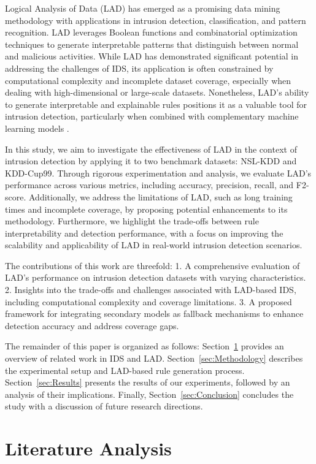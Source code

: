 \documentclass[pdflatex,sn-mathphys-num]{sn-jnl}%
\theoremstyle{thmstyleone}%
\theoremstyle{thmstyletwo}%
\theoremstyle{thmstylethree}%
\begin{document}
Logical Analysis of Data (LAD) has emerged as a promising data mining methodology with applications in intrusion detection, classification, and pattern recognition. LAD leverages Boolean functions and combinatorial optimization techniques to generate interpretable patterns that distinguish between normal and malicious activities. While LAD has demonstrated significant potential in addressing the challenges of IDS, its application is often constrained by computational complexity and incomplete dataset coverage, especially when dealing with high-dimensional or large-scale datasets. Nonetheless, LAD's ability to generate interpretable and explainable rules positions it as a valuable tool for intrusion detection, particularly when combined with complementary machine learning models \cite{LAD1, LAD2}.

In this study, we aim to investigate the effectiveness of LAD in the context of intrusion detection by applying it to two benchmark datasets: NSL-KDD and KDD-Cup99. Through rigorous experimentation and analysis, we evaluate LAD's performance across various metrics, including accuracy, precision, recall, and F2-score. Additionally, we address the limitations of LAD, such as long training times and incomplete coverage, by proposing potential enhancements to its methodology. Furthermore, we highlight the trade-offs between rule interpretability and detection performance, with a focus on improving the scalability and applicability of LAD in real-world intrusion detection scenarios.

The contributions of this work are threefold: 
1. A comprehensive evaluation of LAD's performance on intrusion detection datasets with varying characteristics.
2. Insights into the trade-offs and challenges associated with LAD-based IDS, including computational complexity and coverage limitations.
3. A proposed framework for integrating secondary models as fallback mechanisms to enhance detection accuracy and address coverage gaps.

The remainder of this paper is organized as follows: Section~\ref{sec:Review} provides an overview of related work in IDS and LAD. Section~\ref{sec:Methodology} describes the experimental setup and LAD-based rule generation process. Section~\ref{sec:Results} presents the results of our experiments, followed by an analysis of their implications. Finally, Section~\ref{sec:Conclusion} concludes the study with a discussion of future research directions.

\section{Literature Analysis } \label{sec:Review}
\end{document}
